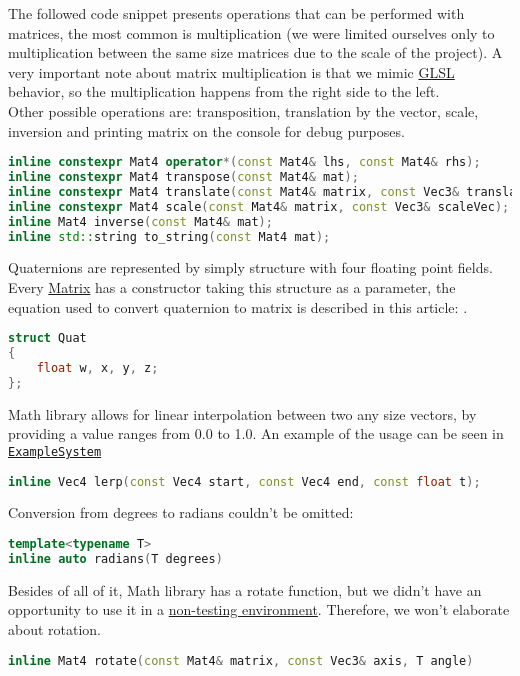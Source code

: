 The followed code snippet presents operations that can be performed with matrices, the most common is multiplication (we were limited ourselves only to multiplication between the same size matrices due to the scale of the project). A very important note about matrix multiplication is that we mimic \hyperref[sec:glsl]{GLSL} behavior, so the multiplication happens from the right side to the left.\\Other possible operations are: transposition, translation by the vector, scale, inversion and printing matrix on the console for debug purposes.
\begin{lstlisting}[language=c++, caption=Matrix operations(./engine/include/tsengine/math.hpp)]
inline constexpr Mat4 operator*(const Mat4& lhs, const Mat4& rhs);
inline constexpr Mat4 transpose(const Mat4& mat);
inline constexpr Mat4 translate(const Mat4& matrix, const Vec3& translation);
inline constexpr Mat4 scale(const Mat4& matrix, const Vec3& scaleVec);
inline Mat4 inverse(const Mat4& mat);
inline std::string to_string(const Mat4 mat);
\end{lstlisting}
Quaternions are represented by simply structure with four floating point fields. Every \hyperref[sec:mat]{Matrix} has a constructor taking this structure as a parameter, the equation used to convert quaternion to matrix is described in this article: \cite{quatToMat}.
\begin{lstlisting}[language=c++, caption=Quaternion class(./engine/include/tsengine/math.hpp)]
struct Quat
{
    float w, x, y, z;
};
\end{lstlisting}
Math library allows for linear interpolation between two any size vectors, by providing a value ranges from 0.0 to 1.0.
An example of the usage can be seen in \hyperref[sec:example_system]{\texttt{ExampleSystem}}
\begin{lstlisting}[language=c++, caption=Linear interpolation of Vector(./engine/include/tsengine/math.hpp)]
inline Vec4 lerp(const Vec4 start, const Vec4 end, const float t);
\end{lstlisting}
Conversion from degrees to radians couldn't be omitted:
\begin{lstlisting}[language=c++, caption=Radians conversion(./engine/include/tsengine/math.hpp)]
template<typename T>
inline auto radians(T degrees)
\end{lstlisting}
Besides of all of it, Math library has a rotate function, but we didn't have an opportunity to use it in a \hyperref[sec:rotation_test]{non-testing environment}. Therefore, we won't elaborate about rotation. %
\begin{lstlisting}[language=c++, caption=Rotation function(./engine/include/tsengine/math.hpp)]
inline Mat4 rotate(const Mat4& matrix, const Vec3& axis, T angle)
\end{lstlisting}
